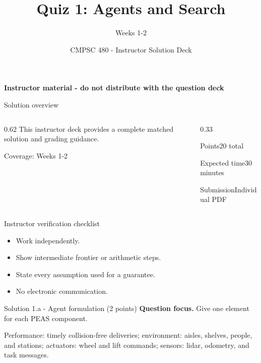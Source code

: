 \documentclass[aspectratio=169,11pt]{beamer}
\title[Quiz 1 Solutions]{Quiz 1: Agents and Search}
\subtitle{Weeks 1-2}
\author{CMPSC 480 - Instructor Solution Deck}
\date{}
\begin{document}
\begin{frame}
  \titlepage
\vspace{-0.35cm}
\begin{center}
\color{coursered}\bfseries Instructor material - do not distribute with the question deck
\end{center}
\end{frame}

\begin{frame}{Solution overview}
\begin{columns}[T,onlytextwidth]
\begin{column}{0.62\textwidth}
\Large This instructor deck provides a complete matched solution and grading guidance.

\vspace{0.35cm}
\normalsize
Coverage: Weeks 1-2
\end{column}
\begin{column}{0.33\textwidth}
\begin{block}{Points}20 total\end{block}
\begin{block}{Expected time}30 minutes\end{block}
\begin{block}{Submission}Individual PDF\end{block}
\end{column}
\end{columns}
\end{frame}

\begin{frame}{Instructor verification checklist}
\small
\begin{itemize}
  \item Work independently.
  \item Show intermediate frontier or arithmetic steps.
  \item State every assumption used for a guarantee.
  \item No electronic communication.
\end{itemize}
\end{frame}

\begin{frame}{Solution 1.a - Agent formulation (2 points)}
\small
\textbf{Question focus.} Give one element for each PEAS component.

\vspace{0.25cm}
\answerlabel Performance: timely collision-free deliveries; environment: aisles, shelves, people, and stations; actuators: wheel and lift commands; sensors: lidar, odometry, and task messages.
\end{frame}
\end{document}
